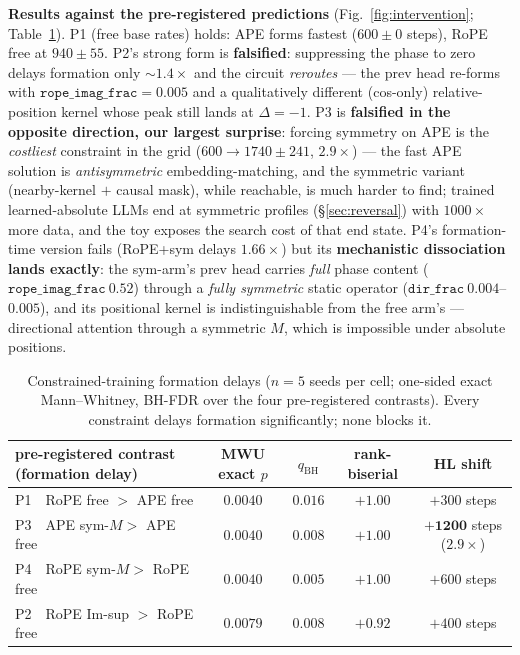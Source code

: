 \documentclass[11pt]{article}
\newcommand{\dirfrac}{\texttt{dir\_frac}\xspace}
\newcommand{\ropeimag}{\texttt{rope\_imag\_frac}\xspace}
\newcommand{\M}{\ensuremath{M}\xspace}
\newcommand{\Rope}{RoPE\xspace}
\begin{document}
\textbf{Results against the pre-registered predictions} (Fig.~\ref{fig:intervention};
Table~\ref{tab:intervention}). P1 (free base rates) holds: APE forms fastest ($600\pm0$ steps), \Rope free at
$940\pm55$. P2's strong form is \textbf{falsified}: suppressing the phase to zero delays formation only
${\sim}1.4\times$ and the circuit \emph{reroutes} --- the prev head re-forms with $\ropeimag{=}0.005$ and a
qualitatively different (cos-only) relative-position kernel whose peak still lands at $\Delta{=}{-}1$. P3 is
\textbf{falsified in the opposite direction, our largest surprise}: forcing symmetry on APE is the \emph{costliest}
constraint in the grid ($600\to1740\pm241$, $2.9\times$) --- the fast APE solution is \emph{antisymmetric}
embedding-matching, and the symmetric variant (nearby-kernel $+$ causal mask), while reachable, is much harder to
find; trained learned-absolute LLMs end at symmetric profiles (\S\ref{sec:reversal}) with $1000\times$ more data,
and the toy exposes the search cost of that end state. P4's formation-time version fails (RoPE+sym delays
$1.66\times$) but its \textbf{mechanistic dissociation lands exactly}: the sym-arm's prev head carries
\emph{full} phase content ($\ropeimag\ 0.52$) through a \emph{fully symmetric} static operator
($\dirfrac\ 0.004$--$0.005$), and its positional kernel is indistinguishable from the free arm's --- directional
attention through a symmetric \M, which is impossible under absolute positions.

\begin{table}[t]\centering\small
\begin{tabular}{lcccc}\toprule
pre-registered contrast (formation delay) & MWU exact $p$ & $q_{\mathrm{BH}}$ & rank-biserial & HL shift\\\midrule
P1\ \ \Rope free $>$ APE free          & $0.0040$ & $0.016$ & $+1.00$ & $+300$ steps\\
P3\ \ APE sym-\M $>$ APE free          & $0.0040$ & $0.008$ & $+1.00$ & $\mathbf{+1200}$ steps ($2.9\times$)\\
P4\ \ \Rope sym-\M $>$ \Rope free      & $0.0040$ & $0.005$ & $+1.00$ & $+600$ steps\\
P2\ \ \Rope Im-sup $>$ \Rope free      & $0.0079$ & $0.008$ & $+0.92$ & $+400$ steps\\
\bottomrule\end{tabular}
\caption{Constrained-training formation delays ($n{=}5$ seeds per cell; one-sided exact Mann--Whitney, BH-FDR over
the four pre-registered contrasts). Every constraint delays formation significantly; none blocks it.}
\label{tab:intervention}
\end{table}
\end{document}
